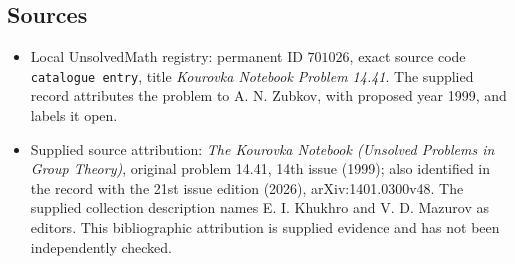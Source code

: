 \documentclass[11pt]{article}
\begin{document}
\subsection{Sources}
\begin{itemize}
\item Local UnsolvedMath registry: permanent ID \(701026\), exact source code \texttt{catalogue entry}, title \emph{Kourovka Notebook Problem 14.41}. The supplied record attributes the problem to A. N. Zubkov, with proposed year 1999, and labels it open.
\item Supplied source attribution: \emph{The Kourovka Notebook (Unsolved Problems in Group Theory)}, original problem 14.41, 14th issue (1999); also identified in the record with the 21st issue edition (2026), arXiv:1401.0300v48. The supplied collection description names E. I. Khukhro and V. D. Mazurov as editors. This bibliographic attribution is supplied evidence and has not been independently checked.
\end{itemize}
\end{document}
